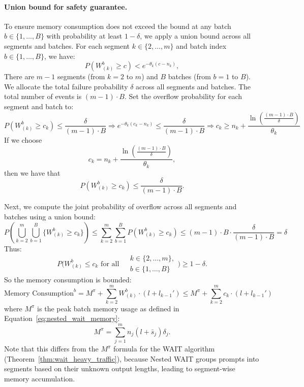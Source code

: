 \paragraph{Union bound for safety guarantee.}
To ensure memory consumption does not exceed the bound at any batch $b \in \{1, \dots, B\}$ with probability at least \( 1 - \delta \), we apply a union bound across all segments and batches. For each segment \( k \in \{2, \dots, m\} \) and batch index \( b \in \{1, \dots, B\} \), we have:
\[ P\left( W^b_{(k)} \geq c \right) < e^{-\theta_k (c - n_k)}, \]
There are \( m - 1 \) segments (from \( k = 2 \) to \( m \)) and \( B \) batches (from \( b = 1 \) to \( B \)). We allocate the total failure probability \( \delta \) across all segments and batches. The total number of events is \( (m - 1) \cdot B \). Set the overflow probability for each segment and batch to:
$$P\left( W^b_{(k)} \geq c_k \right) \leq \frac{\delta}{(m - 1) \cdot B}\Rightarrow e^{-\theta_k (c_k - n_k)} \leq \frac{\delta}{(m - 1) \cdot B}\Rightarrow c_k \geq n_k + \frac{\ln\left( \frac{(m - 1) \cdot B}{\delta} \right)}{\theta_k}$$
If we choose
\[ c_k = n_k + \frac{\ln\left( \frac{(m - 1) \cdot B}{\delta} \right)}{\theta_k}, \]
then we have that
\[ P\left( W^b_{(k)} \geq c_k \right) \leq \frac{\delta}{(m - 1) \cdot B}. \]

Next, we compute the joint probability of overflow across all segments and batches using a union bound:
$$P\left( \bigcup_{k=2}^m \bigcup_{b=1}^B \{ W^b_{(k)} \geq c_k \} \right) \leq \sum_{k=2}^m \sum_{b=1}^B P\left( W^b_{(k)} \geq c_k \right)\leq (m - 1) \cdot B \cdot \frac{\delta}{(m - 1) \cdot B} = \delta$$
Thus:
$$P\bigg( W^b_{(k)} \leq c_k \text{ for all }
\begin{aligned}
    &k \in \{2, \dots, m\}, \\
    &b \in \{1, \dots, B\}
\end{aligned} \bigg)
\geq 1 - \delta.$$
So the memory consumption is bounded:
$$    \text{Memory Consumption}^b
= M^{\pi} + \sum_{k=2}^m W^b_{(k)} \cdot (l + l_{k-1}')\leq M^{\pi} + \sum_{k=2}^m c_k \cdot (l + l_{k-1}')$$
where $M^\pi$ is the peak batch memory usage as defined in Equation~\eqref{eq:nested_wait_memory}:
$$M^\pi = \sum_{j=1}^m n_j(l+\bar s_j)\delta_j.$$
Note that this differs from the $M^\pi$ formula for the WAIT algorithm (Theorem~\ref{thm:wait_heavy_traffic}), because Nested WAIT groups prompts into segments based on their unknown output lengths, leading to segment-wise memory accumulation.

